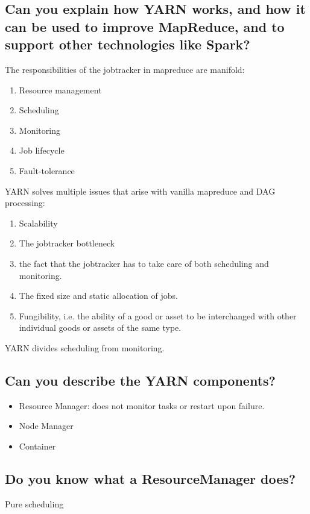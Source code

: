 \documentclass{article}
\begin{document}
\subsection{Can you explain how YARN works, and how it can be used to improve MapReduce, and to support other technologies like Spark?}

The responsibilities of the jobtracker in mapreduce are manifold:

\begin{enumerate}
\item Resource management
\item Scheduling
\item Monitoring
\item Job lifecycle
\item Fault-tolerance
\end{enumerate}


YARN solves multiple issues that arise with vanilla mapreduce and DAG processing:
\begin{enumerate}
\item Scalability
\item The jobtracker bottleneck
\item the fact that the jobtracker has to take care of both scheduling and monitoring.
\item The fixed size and static allocation of jobs.
\item Fungibility, i.e. the ability of a good or asset to be interchanged with other individual goods or assets of the same type.
\end{enumerate}

YARN divides scheduling from monitoring.

\subsection{Can you describe the YARN components?}

\begin{itemize}
\item Resource Manager: does not monitor tasks or restart upon failure.
\item Node Manager
\item Container
\end{itemize}

\subsection{Do you know what a ResourceManager does?}
Pure scheduling
\end{document}
